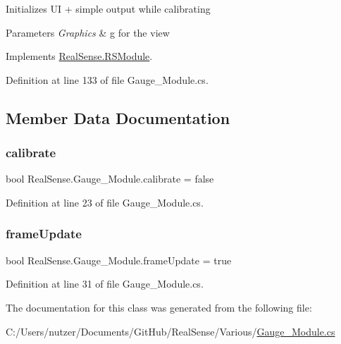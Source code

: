 Initializes UI + simple output while calibrating 
\begin{DoxyParams}{Parameters}
{\em Graphics} & g for the view \\
\hline
\end{DoxyParams}


Implements \hyperlink{class_real_sense_1_1_r_s_module_a2ec830b7932ee7c0077d473f81c73867}{Real\+Sense.\+R\+S\+Module}.



Definition at line 133 of file Gauge\+\_\+\+Module.\+cs.



\subsection{Member Data Documentation}
\mbox{\label{class_real_sense_1_1_gauge___module_a116882e1610b28a8ce6159b1ddbbf578}} 
\subsubsection{\texorpdfstring{calibrate}{calibrate}}
{\footnotesize\ttfamily bool Real\+Sense.\+Gauge\+\_\+\+Module.\+calibrate = false}



Definition at line 23 of file Gauge\+\_\+\+Module.\+cs.

\mbox{\label{class_real_sense_1_1_gauge___module_ae9d8d183234958600957fdfd23c4d850}} 
\subsubsection{\texorpdfstring{frame\+Update}{frameUpdate}}
{\footnotesize\ttfamily bool Real\+Sense.\+Gauge\+\_\+\+Module.\+frame\+Update = true}



Definition at line 31 of file Gauge\+\_\+\+Module.\+cs.



The documentation for this class was generated from the following file\+:\begin{DoxyCompactItemize}
\item 
C\+:/\+Users/nutzer/\+Documents/\+Git\+Hub/\+Real\+Sense/\+Various/\hyperlink{_gauge___module_8cs}{Gauge\+\_\+\+Module.\+cs}\end{DoxyCompactItemize}
